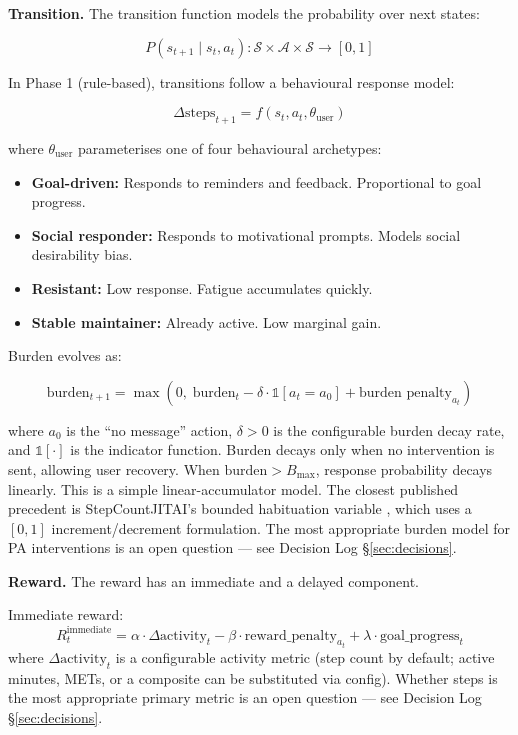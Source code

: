 \documentclass[11pt,a4paper]{article}
\begin{document}
\textbf{Transition.} The transition function models the probability over next states:

\[
P(s_{t+1} \mid s_t, a_t): \mathcal{S} \times \mathcal{A} \times \mathcal{S}
\rightarrow [0,1]
\]

In Phase 1 (rule-based), transitions follow a behavioural response model:

\[
\Delta \text{steps}_{t+1} = f(s_t, a_t, \theta_{\text{user}})
\]

where $\theta_{\text{user}}$ parameterises one of four behavioural archetypes:

\begin{itemize}[noitemsep]
    \item \textbf{Goal-driven:} Responds to reminders and feedback.
    Proportional to goal progress.
    \item \textbf{Social responder:} Responds to motivational prompts.
    Models social desirability bias.
    \item \textbf{Resistant:} Low response. Fatigue accumulates quickly.
    \item \textbf{Stable maintainer:} Already active. Low marginal gain.
\end{itemize}

Burden evolves as:

\[
\text{burden}_{t+1} = \max(0,\; \text{burden}_t - \delta \cdot \mathbb{1}[a_t = a_0] + \text{burden\ penalty}_{a_t})
\]

where $a_0$ is the ``no message'' action, $\delta > 0$ is the configurable
burden decay rate, and $\mathbb{1}[\cdot]$ is the indicator function.
Burden decays only when no intervention is sent, allowing user recovery.
When $\text{burden} > B_{\max}$, response probability decays linearly.
This is a simple linear-accumulator model. The closest published precedent
is StepCountJITAI's bounded habituation variable \cite{karine2024stepcountjitai},
which uses a $[0,1]$ increment/decrement formulation. The most appropriate
burden model for PA interventions is an open question
--- see Decision Log \S\ref{sec:decisions}.

\textbf{Reward.} The reward has an immediate and a delayed component.

Immediate reward:
\[
R_t^{\text{immediate}} = \alpha \cdot \Delta\text{activity}_t
- \beta \cdot \text{reward\_penalty}_{a_t}
+ \lambda \cdot \text{goal\_progress}_t
\]
where $\Delta\text{activity}_t$ is a configurable activity metric (step
count by default; active minutes, METs, or a composite can be substituted
via config). Whether steps is the most appropriate primary metric is an
open question --- see Decision Log \S\ref{sec:decisions}.
\end{document}
